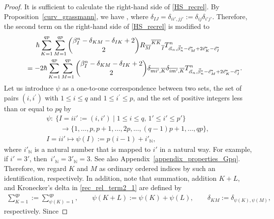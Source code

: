 \documentclass[10pt,a4paper]{amsart}
\numberwithin{equation}{section}
\begin{document}
\begin{proof}It is sufficient to calculate the right-hand side of \eqref{HS_recrel}.
By Proposition~\ref{curv_grassmann}, we have
,
where $\delta_{IJ}=\delta_{ii',jj'}:=\delta_{ij}\delta_{i'j'}$.
Therefore, the second term on the right-hand side of \eqref{HS_recrel} is modified to
\begin{gather}
 \hbar
 \sum_{K=1}^{qp}
 \sum_{M=1}^{qp}
 \dbinom{\beta_{I}^{n}-\delta_{KM}-\delta_{IK}+2}{2}
 {{R_{\overline{M}}}^{\overline{K}\overline{K}}}_{\overline{I}}
 T^{n}_{\vec{\alpha}_{n},\vec{\beta}_{n}^{\ast}-\vec{e}_{M}^{\ast}+2\vec{e}_{K}^{\ast}-\vec{e}_{I}^{\ast}}
 \nonumber
 \\
 \qquad=
 -
 2
 \hbar
 \sum_{K=1}^{qp}
 \sum_{M=1}^{qp}
 \dbinom{\beta_{I}^{n}-\delta_{KM}-\delta_{IK}+2}{2}
 \delta_{
 \overline{mi'},
 \overline{K}
 }
 \delta_{
 \overline{im'},
 \overline{K}
 }
 T^{n}_{\vec{\alpha}_{n},\vec{\beta}_{n}^{\ast}-\vec{e}_{M}^{\ast}+2\vec{e}_{K}^{\ast}-\vec{e}_{I}^{\ast}}.
 \label{rec_rel_term2_1}
\end{gather}
Let us introduce $\psi$ as a one-to-one correspondence between two sets, the set of pairs $(i, i^{\prime})$ with $1 \le i \le q$ and $1 \le i^{\prime} \le p$, and the set of positive integers less than or equal to $pq$ by
\begin{gather*}
 \psi
 \colon\
 \{
 I
 =
 ii'
 :=
 (
 i,i'
 )
\mid
 1
 \leq
 i
 \leq
 q,\,
 1'
 \leq
 i'
 \leq
 p'
 \}
 \\
 \qquad\to
 \{
 1,
 \dots,
 p,
 p+1,
 \dots,
 2p,
 \dots,
 (q-1)p+1,
 \dots,
 qp
 \},
 \\
 I
 =
 ii'
 \mapsto
 \psi(I)
 :=
 p(i-1)
 +
 {i'}_{\mathbb{N}},
\end{gather*}
where ${i'}_{\mathbb{N}}$ is a natural number that
is mapped to $i'$ in a natural way. For example, if $i'=3'$, then~${{i'}_{\mathbb{N}}={3'}_{\mathbb{N}}=3}$. See also Appendix~\ref{appendix_properties_Gpq}.
Therefore, we regard $K$ and $M$ as ordinary ordered indices by such an identification, respectively. In addition, note that summation, addition $K+L$, and Kronecker's delta in \eqref{rec_rel_term2_1} are defined by
\begin{align*}
\sum_{K=1}^{qp}
:=
\sum_{\psi(K)=1}^{qp},
\qquad
\psi( K+L )
:=
\psi(K)+\psi(L),
\qquad
\delta_{KM}
:=
\delta_{\psi(K),\psi(M)},
\end{align*}
respectively. Since

\end{proof}
\end{document}
